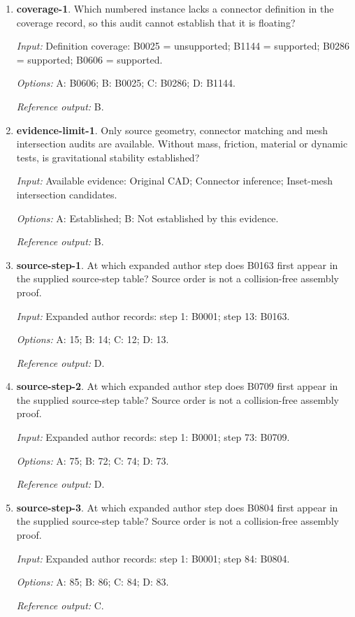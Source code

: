 \begin{enumerate}
\item \textbf{coverage-1}. Which numbered instance lacks a connector definition in the coverage record, so this audit cannot establish that it is floating?\par {\small \textit{Input:} Definition coverage: B0025 = unsupported; B1144 = supported; B0286 = supported; B0606 = supported. \par\textit{Options:} A: B0606; B: B0025; C: B0286; D: B1144. \par\textit{Reference output:} B.}
\item \textbf{evidence-limit-1}. Only source geometry, connector matching and mesh intersection audits are available. Without mass, friction, material or dynamic tests, is gravitational stability established?\par {\small \textit{Input:} Available evidence: Original CAD; Connector inference; Inset-mesh intersection candidates. \par\textit{Options:} A: Established; B: Not established by this evidence. \par\textit{Reference output:} B.}
\item \textbf{source-step-1}. At which expanded author step does B0163 first appear in the supplied source-step table? Source order is not a collision-free assembly proof.\par {\small \textit{Input:} Expanded author records: step 1: B0001; step 13: B0163. \par\textit{Options:} A: 15; B: 14; C: 12; D: 13. \par\textit{Reference output:} D.}
\item \textbf{source-step-2}. At which expanded author step does B0709 first appear in the supplied source-step table? Source order is not a collision-free assembly proof.\par {\small \textit{Input:} Expanded author records: step 1: B0001; step 73: B0709. \par\textit{Options:} A: 75; B: 72; C: 74; D: 73. \par\textit{Reference output:} D.}
\item \textbf{source-step-3}. At which expanded author step does B0804 first appear in the supplied source-step table? Source order is not a collision-free assembly proof.\par {\small \textit{Input:} Expanded author records: step 1: B0001; step 84: B0804. \par\textit{Options:} A: 85; B: 86; C: 84; D: 83. \par\textit{Reference output:} C.}

\end{enumerate}
